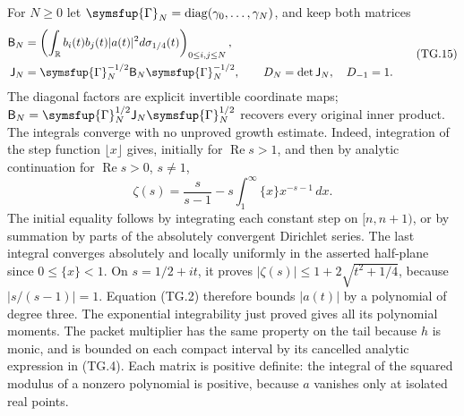 For \(N\geq0\) let \(\symsfup{\Gamma}_N=\operatorname{diag}
(\gamma_0,\ldots,\gamma_N)\), and keep both matrices
\[
 \begin{aligned}
 \mathsf B_N&=\left(\int_{\mathbb{R}}
              b_i(t)b_j(t)|a(t)|^2d\sigma_{1/4}(t)\right)_{0\leq i,j\leq N},\\
 \mathsf J_N&=\symsfup{\Gamma}_N^{-1/2}\mathsf B_N
                       \symsfup{\Gamma}_N^{-1/2},\qquad
 D_N=\det\mathsf J_N,\quad D_{-1}=1.
 \end{aligned}                                                    \tag{TG.15}
\]
The diagonal factors are explicit invertible coordinate maps;
\(\mathsf B_N=\symsfup{\Gamma}_N^{1/2}\mathsf J_N
\symsfup{\Gamma}_N^{1/2}\) recovers every original inner product.
The integrals converge with no unproved growth estimate.  Indeed,
integration of the step function \(\lfloor x\rfloor\) gives,
initially for \(\operatorname{Re}s>1\), and then by analytic
continuation for \(\operatorname{Re}s>0\), \(s\ne1\),
\[
 \zeta(s)=\frac{s}{s-1}
         -s\int_1^\infty\{x\}x^{-s-1}\,dx.
\]
The initial equality follows by integrating each constant step on
\([n,n+1)\), or by summation by parts of the absolutely convergent
Dirichlet series.  The last integral converges absolutely and
locally uniformly in the asserted half-plane since \(0\leq\{x\}<1\).
On \(s=1/2+it\), it proves
\( |\zeta(s)|\leq1+2\sqrt{t^2+1/4}\), because
\(|s/(s-1)|=1\).  Equation (TG.2) therefore bounds \(|a(t)|\)
by a polynomial of degree three.  The exponential integrability
just proved gives all its polynomial moments.  The packet
multiplier has the same property on the tail because \(h\) is
monic, and is bounded on each compact interval by its cancelled
analytic expression in (TG.4).
Each matrix is positive definite:
the integral of the squared modulus of a nonzero polynomial is
positive, because \(a\) vanishes only at isolated real points.

